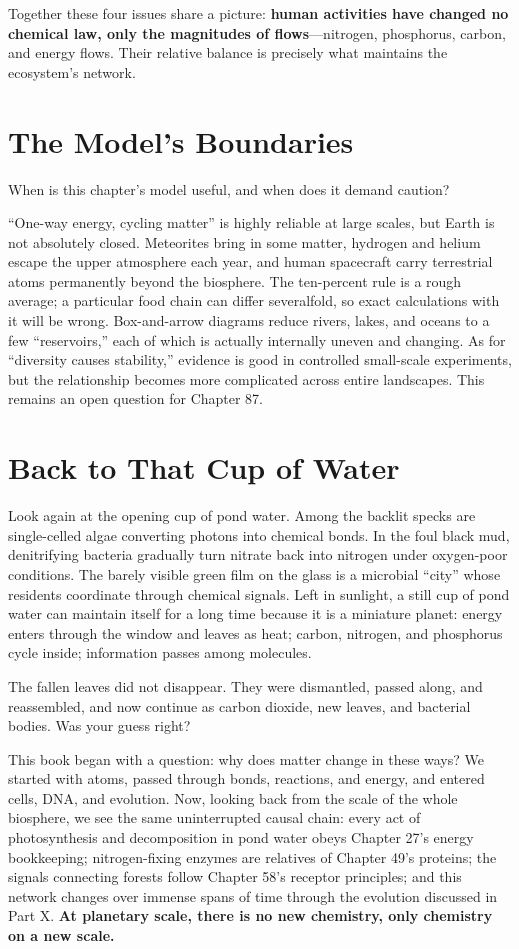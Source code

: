 Together these four issues share a picture: \textbf{human activities have changed no chemical law, only the magnitudes of flows}---nitrogen, phosphorus, carbon, and energy flows. Their relative balance is precisely what maintains the ecosystem's network.

\section{The Model's Boundaries}

When is this chapter's model useful, and when does it demand caution?

``One-way energy, cycling matter'' is highly reliable at large scales, but Earth is not absolutely closed. Meteorites bring in some matter, hydrogen and helium escape the upper atmosphere each year, and human spacecraft carry terrestrial atoms permanently beyond the biosphere. The ten-percent rule is a rough average; a particular food chain can differ severalfold, so exact calculations with it will be wrong. Box-and-arrow diagrams reduce rivers, lakes, and oceans to a few ``reservoirs,'' each of which is actually internally uneven and changing. As for ``diversity causes stability,'' evidence is good in controlled small-scale experiments, but the relationship becomes more complicated across entire landscapes. This remains an open question for Chapter 87.

\section{Back to That Cup of Water}

Look again at the opening cup of pond water. Among the backlit specks are single-celled algae converting photons into chemical bonds. In the foul black mud, denitrifying bacteria gradually turn nitrate back into nitrogen under oxygen-poor conditions. The barely visible green film on the glass is a microbial ``city'' whose residents coordinate through chemical signals. Left in sunlight, a still cup of pond water can maintain itself for a long time because it is a miniature planet: energy enters through the window and leaves as heat; carbon, nitrogen, and phosphorus cycle inside; information passes among molecules.

The fallen leaves did not disappear. They were dismantled, passed along, and reassembled, and now continue as carbon dioxide, new leaves, and bacterial bodies. Was your guess right?

This book began with a question: why does matter change in these ways? We started with atoms, passed through bonds, reactions, and energy, and entered cells, DNA, and evolution. Now, looking back from the scale of the whole biosphere, we see the same uninterrupted causal chain: every act of photosynthesis and decomposition in pond water obeys Chapter 27's energy bookkeeping; nitrogen-fixing enzymes are relatives of Chapter 49's proteins; the signals connecting forests follow Chapter 58's receptor principles; and this network changes over immense spans of time through the evolution discussed in Part X. \textbf{At planetary scale, there is no new chemistry, only chemistry on a new scale.}


